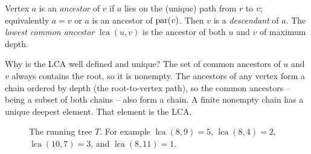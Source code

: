 \begin{definition}
\label{ch23:def-lca}
Vertex $a$ is an \emph{ancestor} of $v$ if $a$ lies on the (unique) path from $r$ to $v$;
equivalently $a=v$ or $a$ is an ancestor of $\operatorname{par}(v)$. Then $v$ is a \emph{descendant} of
$a$. The \emph{lowest common ancestor} $\operatorname{lca}(u,v)$ is the ancestor of both
$u$ and $v$ of maximum depth.
\end{definition}

\begin{intuitionbox}
Why is the LCA well defined and unique? The set of common ancestors of $u$ and $v$ always
contains the root, so it is nonempty. The ancestors of any vertex form a chain ordered by
depth (the root-to-vertex path), so the common ancestors -- being a subset of both chains --
also form a chain. A finite nonempty chain has a unique deepest element. That element is the
LCA.
\end{intuitionbox}

\begin{figure}[H]
\centering
{}
\caption{The running tree $T$. For example $\operatorname{lca}(8,9)=5$,
$\operatorname{lca}(8,4)=2$, $\operatorname{lca}(10,7)=3$, and
$\operatorname{lca}(8,11)=1$.}
\label{ch23:fig-tree}
\end{figure}

